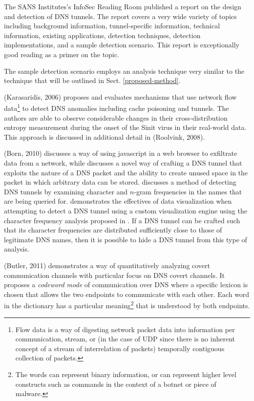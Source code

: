 \documentclass{llncs}
\begin{document}
\label{litreview-dns}
The SANS
Institutes's InfoSec Reading Room published a report on the design and detection
of DNS tunnels\cite{SANS2013}. The report covers a very wide variety of topics
including background information, tunnel-specific information, technical
information, existing applications, detection techniques, detection
implementations, and a sample detection scenario. This report is exceptionally
good reading as a primer on the topic.

The sample detection scenario employs an analysis technique very similar to the
technique that will be outlined in Sect. \ref{proposed-method}.

(Karasaridis, 2006)\cite{Karasaridis2006} proposes and evaluates mechanisms that
use network flow data\footnote{Flow data is a way of digesting network packet
data into information per communication, stream, or (in the case of UDP since
there is no inherent concept of a stream of interrelation of packets) temporally
contiguous collection of packets.} to detect DNS anomalies including cache
poisoning and tunnels. The
authors are able to observe considerable changes in their cross-distribution
entropy measurement during the onset of the Sinit virus in their real-world
data. This approach is discussed in additional detail in (Roolvink,
2008)\cite{Roolvink2008}.

\label{litreview-dns-cfa} (Born, 2010)\cite{Born2010.exfil} discusses a way of
using javascript in a web browser to exfiltrate data from a network, while
\cite{Born2010.psudp} discusses a novel way of crafting a DNS tunnel that
exploits the nature of a DNS packet and the ability to create unused space in
the packet in which arbitrary data can be stored. \cite{Born2010.cfa} discusses
a method of detecting DNS tunnels by examining character and $n$-gram
frequencies in the names that are being queried for. \cite{Born2010.ngviz}
demonstrates the effectives of data visualization when attempting to detect a
DNS tunnel using a custom visualization engine using the character frequency
analysis proposed in \cite{Born2010.cfa}. If a DNS tunnel
can be crafted such that its character frequencies are distributed sufficiently
close to those of legitimate DNS names, then it is possible to hide a DNS tunnel
from this type of analysis.

(Butler, 2011)\cite{Butler2011} demonstrates a way of quantitatively analyzing
covert communication channels with particular focus on DNS covert channels. It
proposes a \emph{codeword mode} of communication over DNS where a specific
lexicon is chosen that allows the two endpoints to communicate with each other.
Each word in the dictionary has a particular meaning\footnote{The words can
represent binary information, or can represent higher level constructs such as
commands in the context of a botnet or piece of malware.} that is understood by
both endpoints.
\end{document}
